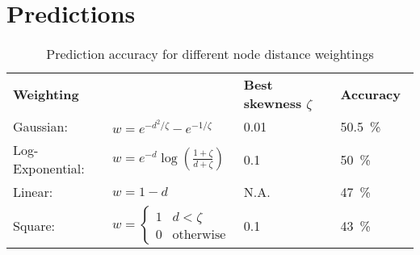 \section{Predictions}
\label{sec:Predictions}


\begin{table}[H]
\caption{Prediction accuracy for different node distance weightings}
\begin{center}
\begin{tabular}{l l l l}
\multicolumn{2}{l}{\textbf{Weighting}}								& \textbf{Best skewness $\zeta$}		& \textbf{Accuracy} \\

Gaussian:		& $w=e^{-d^2/\zeta}-e^{-1/\zeta}$	& \SI{0.01}{}						&\SI{50.5}{\percent} \\

Log-Exponential:	& $w=e^{-d} \log\left( \frac{1+\zeta}{d+\zeta}\right)$				&\SI{0.1}{}							& \SI{50}{\percent} \\ 

Linear:		& $w=1-d$												& N.A. 							&\SI{47}{\percent} \\

Square:		&$w= \begin{cases}
1	&d < \zeta \\
0	& \text{otherwise}
\end{cases}$													& \SI{0.1}{}						& \SI{43}{\percent}
\end{tabular}
\end{center}
\label{default}
\end{table}